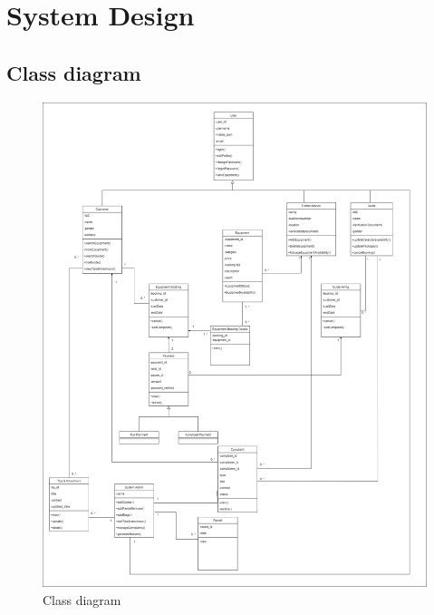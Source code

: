 \section{System Design}
\subsection{Class diagram}
\begin{figure}[h!]
    \centering
    \includegraphics[width=1\textwidth]{Images/classs.drawio.png}
    \caption{Class diagram}
    \label{fig:enter-label}
\end{figure}
\clearpage


